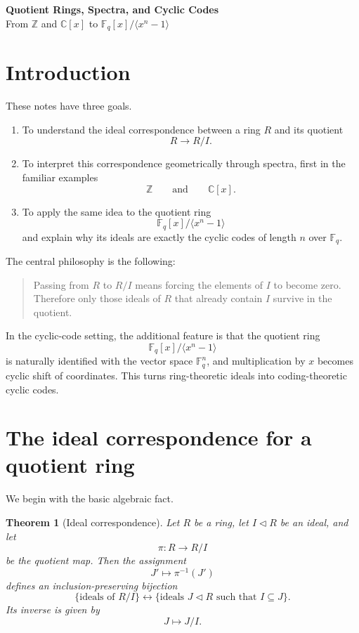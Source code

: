 \documentclass[11pt]{article}
\newtheorem{theorem}{Theorem}[section]
\theoremstyle{definition}
\newcommand{\Z}{\mathbb{Z}}
\newcommand{\C}{\mathbb{C}}
\newcommand{\F}{\mathbb{F}}
\newcommand{\ideal}[1]{\langle #1\rangle}
\begin{document}
	
	\begin{center}
		{\LARGE \textbf{Quotient Rings, Spectra, and Cyclic Codes}}\\[0.5em]
		{\large From $\Z$ and $\C[x]$ to $\F_q[x]/\ideal{x^n-1}$}
	\end{center}
	
	\tableofcontents
	
	\section{Introduction}
	
	These notes have three goals.
	
	\begin{enumerate}[label=\textbf{(\arabic*)}]
		\item To understand the ideal correspondence between a ring $R$ and its quotient
		\[
		R \longrightarrow R/I.
		\]
		
		\item To interpret this correspondence geometrically through spectra, first in the familiar examples
		\[
		\Z \qquad\text{and}\qquad \C[x].
		\]
		
		\item To apply the same idea to the quotient ring
		\[
		\F_q[x]/\ideal{x^n-1}
		\]
		and explain why its ideals are exactly the cyclic codes of length $n$ over $\F_q$.
	\end{enumerate}
	
	The central philosophy is the following:
	
	\begin{quote}
		Passing from $R$ to $R/I$ means forcing the elements of $I$ to become zero.  
		Therefore only those ideals of $R$ that already contain $I$ survive in the quotient.
	\end{quote}
	
	In the cyclic-code setting, the additional feature is that the quotient ring
	\[
	\F_q[x]/\ideal{x^n-1}
	\]
	is naturally identified with the vector space $\F_q^n$, and multiplication by $x$ becomes cyclic shift of coordinates. This turns ring-theoretic ideals into coding-theoretic cyclic codes.
	
	\section{The ideal correspondence for a quotient ring}
	
	We begin with the basic algebraic fact.
	
	\begin{theorem}[Ideal correspondence]\label{thm:ideal-correspondence}
		Let $R$ be a ring, let $I \triangleleft R$ be an ideal, and let
		\[
		\pi:R\longrightarrow R/I
		\]
		be the quotient map. Then the assignment
		\[
		J' \longmapsto \pi^{-1}(J')
		\]
		defines an inclusion-preserving bijection
		\[
		\{\text{ideals of }R/I\}
		\longleftrightarrow
		\{\text{ideals }J\triangleleft R \text{ such that } I\subseteq J\}.
		\]
		Its inverse is given by
		\[
		J \longmapsto J/I.
		\]
	\end{theorem}
	
\end{document}
